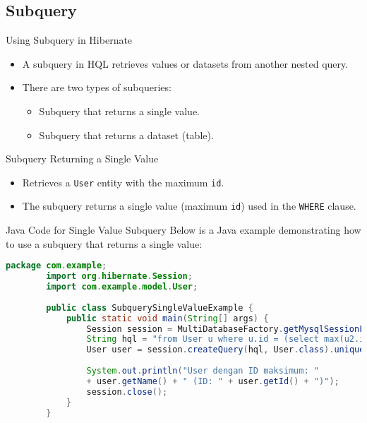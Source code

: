 \documentclass[aspectratio=169, table]{beamer}
\begin{document}
\subsection{Subquery}

\begin{frame}{Using Subquery in Hibernate}
	\vspace{20pt}
	\begin{itemize}
		\item A subquery in HQL retrieves values or datasets from another nested query.
		\item There are two types of subqueries:
		\begin{itemize}
			\item Subquery that returns a single value.
			\item Subquery that returns a dataset (table).
		\end{itemize}
	\end{itemize}
\end{frame}

\begin{frame}{Subquery Returning a Single Value}
	\vspace{20pt}
	\begin{itemize}
		\item Retrieves a \texttt{User} entity with the maximum \texttt{id}.
		\item The subquery returns a single value (maximum \texttt{id}) used in the \texttt{WHERE} clause.
	\end{itemize}
\end{frame}

\begin{frame}[fragile]{Java Code for Single Value Subquery}
	\vspace{20pt}
	Below is a Java example demonstrating how to use a subquery that returns a single value:
	
	\begin{lstlisting}[language=Java, style=JavaStyle]
		package com.example;
		import org.hibernate.Session;
		import com.example.model.User;
		
		public class SubquerySingleValueExample {
			public static void main(String[] args) {
				Session session = MultiDatabaseFactory.getMysqlSessionFactory().openSession();
				String hql = "from User u where u.id = (select max(u2.id) from User u2)";
				User user = session.createQuery(hql, User.class).uniqueResult();
				
				System.out.println("User dengan ID maksimum: " 
				+ user.getName() + " (ID: " + user.getId() + ")");
				session.close();
			}
		}
	\end{lstlisting}
\end{frame}
\end{document}
